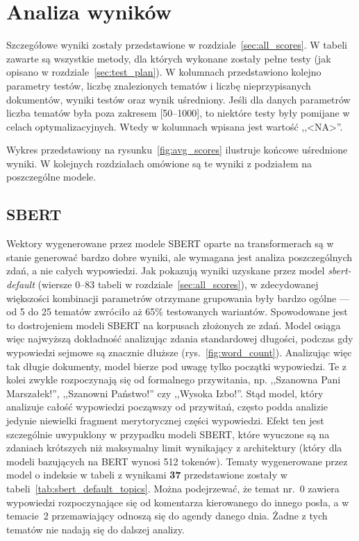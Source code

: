 
\chapter{Analiza wyników}
	Szczegółowe wyniki zostały przedstawione w rozdziale~\ref{sec:all_scores}.
	W tabeli zawarte są wszystkie metody, dla których wykonane zostały pełne testy (jak opisano w rozdziale~\ref{sec:test_plan}).
	W kolumnach przedstawiono kolejno parametry testów, liczbę znalezionych tematów i liczbę nieprzypisanych dokumentów, wyniki testów oraz wynik uśredniony.
	Jeśli dla danych parametrów liczba tematów była poza zakresem [50--1000], to niektóre testy były pomijane w celach optymalizacyjnych.
	Wtedy w kolumnach wpisana jest wartość ,,<NA>''.

	Wykres przedstawiony na rysunku~\ref{fig:avg_scores} ilustruje końcowe uśrednione wyniki.
	W kolejnych rozdziałach omówione są te wyniki z podziałem na poszczególne modele.

\section{SBERT}
	Wektory wygenerowane przez modele SBERT oparte na transformerach są w stanie generować bardzo dobre wyniki,
		ale wymagana jest analiza poszczególnych zdań, a nie całych wypowiedzi.
	Jak pokazują wyniki uzyskane przez model \emph{sbert-default} (wiersze 0--83 tabeli w rozdziale~\ref{sec:all_scores}),
		w zdecydowanej większości kombinacji parametrów otrzymane grupowania były bardzo ogólne --- od 5 do 25 tematów zwróciło aż 65\% testowanych wariantów.
	Spowodowane jest to dostrojeniem modeli SBERT na korpusach złożonych ze zdań.
	Model osiąga więc najwyższą dokładność analizując zdania standardowej długości, podczas gdy wypowiedzi sejmowe są znacznie dłuższe (rys.~\ref{fig:word_count}).
	Analizując więc tak długie dokumenty, model bierze pod uwagę tylko początki wypowiedzi.
	Te z kolei zwykle rozpoczynają się od formalnego przywitania, np. ,,Szanowna Pani Marszałek!'', ,,Szanowni Państwo!'' czy ,,Wysoka Izbo!''.
	Stąd model, który analizuje całość wypowiedzi począwszy od przywitań, często podda analizie jedynie niewielki fragment merytorycznej części wypowiedzi.
	Efekt ten jest szczególnie uwypuklony w przypadku modeli SBERT, które wyuczone są na zdaniach krótszych niż maksymalny limit wynikający z architektury
		(który dla modeli bazujących na BERT wynosi 512 tokenów).
	Tematy wygenerowane przez model o indeksie w tabeli z wynikami \textbf{37} przedstawione zostały w tabeli~\ref{tab:sbert_default_topics}.
	Można podejrzewać, że temat nr.~0 zawiera wypowiedzi rozpoczynające się od komentarza kierowanego do innego posła, a w temacie~2 przemawiający odnoszą się do agendy danego dnia.
	Żadne z tych tematów nie nadają się do dalszej analizy.

